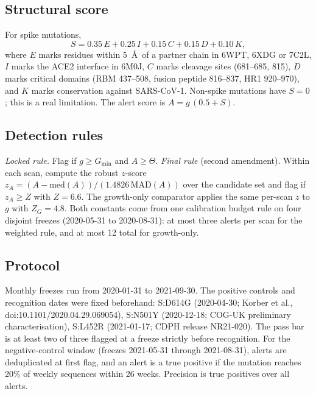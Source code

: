 \documentclass[11pt]{article}
\begin{document}
\subsection{Structural score}
For spike mutations,
\begin{equation}
S = 0.35\,E + 0.25\,I + 0.15\,C + 0.15\,D + 0.10\,K,
\end{equation}
where $E$ marks residues within 5~\AA\ of a partner chain in 6WPT, 6XDG or 7C2L, $I$ marks the ACE2 interface in 6M0J, $C$ marks cleavage sites (681--685, 815), $D$ marks critical domains (RBM 437--508, fusion peptide 816--837, HR1 920--970), and $K$ marks conservation against SARS-CoV-1. Non-spike mutations have $S=0$; this is a real limitation. The alert score is $A=g\,(0.5+S)$.

\subsection{Detection rules}
\emph{Locked rule.} Flag if $g\ge G_{\min}$ and $A\ge\Theta$. \emph{Final rule} (second amendment). Within each scan, compute the robust $z$-score $z_A=(A-\mathrm{med}(A))/(1.4826\,\mathrm{MAD}(A))$ over the candidate set and flag if $z_A\ge Z$ with $Z=6.6$. The growth-only comparator applies the same per-scan $z$ to $g$ with $Z_G=4.8$. Both constants come from one calibration budget rule on four disjoint freezes (2020-05-31 to 2020-08-31): at most three alerts per scan for the weighted rule, and at most 12 total for growth-only.

\subsection{Protocol}
Monthly freezes run from 2020-01-31 to 2021-09-30. The positive controls and recognition dates were fixed beforehand: S:D614G (2020-04-30; Korber et al., doi:10.1101/2020.04.29.069054), S:N501Y (2020-12-18; COG-UK preliminary characterisation), S:L452R (2021-01-17; CDPH release NR21-020). The pass bar is at least two of three flagged at a freeze strictly before recognition. For the negative-control window (freezes 2021-05-31 through 2021-08-31), alerts are deduplicated at first flag, and an alert is a true positive if the mutation reaches 20\% of weekly sequences within 26 weeks. Precision is true positives over all alerts.
\end{document}
